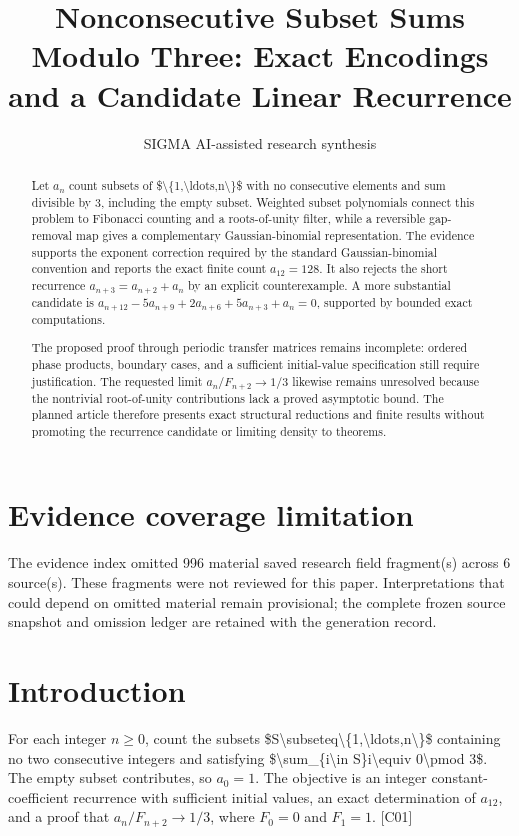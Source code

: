 \documentclass[11pt]{article}
\title{Nonconsecutive Subset Sums Modulo Three: Exact Encodings and a Candidate Linear Recurrence}
\date{}
\author{SIGMA AI-assisted research synthesis}
\begin{document}
\maketitle

\begin{abstract}
Let $a_n$ count subsets of \$\textbackslash{}\{1,\textbackslash{}ldots,n\textbackslash{}\}\$ with no consecutive elements and sum divisible by $3$, including the empty subset. Weighted subset polynomials connect this problem to Fibonacci counting and a roots-of-unity filter, while a reversible gap-removal map gives a complementary Gaussian-binomial representation. The evidence supports the exponent correction required by the standard Gaussian-binomial convention and reports the exact finite count $a_{12}=128$. It also rejects the short recurrence $a_{n+3}=a_{n+2}+a_n$ by an explicit counterexample. A more substantial candidate is $a_{n+12}-5a_{n+9}+2a_{n+6}+5a_{n+3}+a_n=0$, supported by bounded exact computations.

The proposed proof through periodic transfer matrices remains incomplete: ordered phase products, boundary cases, and a sufficient initial-value specification still require justification. The requested limit $a_n/F_{n+2}\to 1/3$ likewise remains unresolved because the nontrivial root-of-unity contributions lack a proved asymptotic bound. The planned article therefore presents exact structural reductions and finite results without promoting the recurrence candidate or limiting density to theorems.
\end{abstract}
\section*{Evidence coverage limitation}
The evidence index omitted 996 material saved research field fragment(s) across 6 source(s). These fragments were not reviewed for this paper. Interpretations that could depend on omitted material remain provisional; the complete frozen source snapshot and omission ledger are retained with the generation record.
\section{Introduction}
For each integer $n\geq 0$, count the subsets \$S\textbackslash{}subseteq\textbackslash{}\{1,\textbackslash{}ldots,n\textbackslash{}\}\$ containing no two consecutive integers and satisfying \$\textbackslash{}sum\_\{i\textbackslash{}in S\}i\textbackslash{}equiv 0\textbackslash{}pmod 3\$. The empty subset contributes, so $a_0=1$. The objective is an integer constant-coefficient recurrence with sufficient initial values, an exact determination of $a_{12}$, and a proof that $a_n/F_{n+2}\to 1/3$, where $F_0=0$ and $F_1=1$. [C01]
\end{document}
